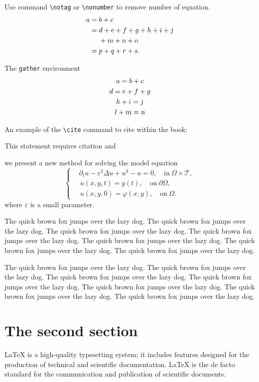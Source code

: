 \documentclass[openany,twoside,12pt]{book}
\theoremstyle{plain}
\numberwithin{equation}{chapter}
\numberwithin{figure}{chapter}
\numberwithin{table}{chapter}
\begin{document}
Use command \verb|\notag| or \verb|\nonumber| to remove number of equation.
\begin{align}
a ={} & b + c \\
={} & d + e + f + g + h + i + j \notag \\
& + m + n + o \\
={} & p + q + r + s.
\end{align}

The \texttt{gather} environment
\begin{gather}
a = b + c \\
d = e + f + g \notag \\
h + i = j \\
l + m = n
\end{gather}

An example of the \verb|\cite| command to cite within the book:

This statement requires citation \cite{Adams2003} and \cite{Shen1994,Tadmor2012,TreWei2014}


we present a new method for solving the model equation
\begin{equation}\label{eq:mulequ}
\left\{\begin{aligned}
  & \partial_{t} u-\varepsilon^{2} \Delta u+u^{3}-u=0, \quad \text{in} ~\Omega\times\mathcal{T}, \\
  &\, u(x,y,t) = g(t), \quad \text{on} ~ \partial \Omega, \\
  &\, u(x,y,0)=\varphi(x, y), \quad \text{on} ~\Omega.
\end{aligned}\right.
\end{equation}
where $\varepsilon$ is a small parameter.

The quick brown fox jumps over the lazy dog. The quick brown fox jumps over the lazy dog. The quick brown fox jumps over the lazy dog. The quick brown fox jumps over the lazy dog. The quick brown fox jumps over the lazy dog. The quick brown fox jumps over the lazy dog. The quick brown fox jumps over the lazy dog.

The quick brown fox jumps over the lazy dog. The quick brown fox jumps over the lazy dog. The quick brown fox jumps over the lazy dog. The quick brown fox jumps over the lazy dog. The quick brown fox jumps over the lazy dog. The quick brown fox jumps over the lazy dog. The quick brown fox jumps over the lazy dog.


\section{The second section}
LaTeX is a high-quality typesetting system; it includes features designed for the production of technical and scientific documentation. LaTeX is the de facto standard for the communication and publication of scientific documents.
\end{document}

